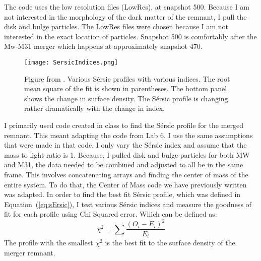 \documentclass[fleqn,usenatbib]{mnras}
\begin{document}
The code uses the low resolution files (LowRes), at snapshot 500. Because I am not interested in the morphology of the dark matter of the remnant, I pull the disk and bulge particles. The LowRes files were chosen because I am not interested in the exact location of particles. Snapshot 500 is comfortably after the Mw-M31 merger which happens at approximately snapshot 470. 

\begin{figure}
	\texttt{[image: SersicIndices.png]}
    \caption{Figure from \citet{Aceves2006}. Various S\'ersic profiles with various indices. The root mean square of the fit is shown in parentheses. The bottom panel shows the change in surface density. The S\'ersic profile is changing rather dramatically with the change in index.}
    \label{fig:ProfileFits}
\end{figure}

I primarily used code created in class to find the S\'ersic profile for the merged remnant. This meant adapting the code from Lab 6. I use the same assumptions that were made in that code, I only vary the S\'ersic index and assume that the mass to light ratio is 1. Because, I pulled disk and bulge particles for both MW and M31, the data needed to be combined and adjusted to all be in the same frame. This involves concatenating arrays and finding the center of mass of the entire system. To do that, the Center of Mass code we have previously written was adapted. In order to find the best fit S\'ersic profile,  which was defined in Equation~(\ref{eq:sErsic}), I test various S\'ersic indices and measure the goodness of fit for each profile using Chi Squared error. Which can be defined as:
\begin{equation}
    \chi^2 = \sum \frac{(O_i - E_i)^2 }{E_i}
\end{equation}
The profile with the smallest $\chi^2$ is the best fit to the surface density of the merger remnant. 
\end{document}
